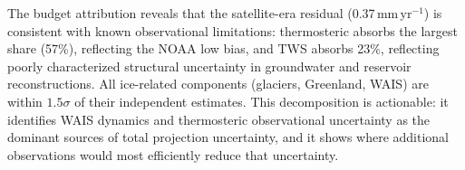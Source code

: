 \documentclass[11pt]{article}
\begin{document}
The budget attribution reveals that the satellite-era residual (0.37\,mm\,yr$^{-1}$) is consistent with known observational limitations: thermosteric absorbs the largest share (57\%), reflecting the NOAA low bias, and TWS absorbs 23\%, reflecting poorly characterized structural uncertainty in groundwater and reservoir reconstructions. All ice-related components (glaciers, Greenland, WAIS) are within $1.5\sigma$ of their independent estimates. This decomposition is actionable: it identifies WAIS dynamics and thermosteric observational uncertainty as the dominant sources of total projection uncertainty, and it shows where additional observations would most efficiently reduce that uncertainty.



\end{document}
